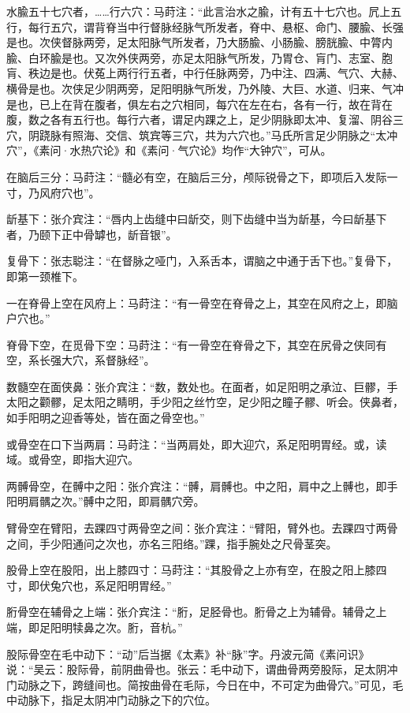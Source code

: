 \documentclass[12pt]{ctexbook}%
\begin{document}
\begin{jiaozhu}
	\item 水腧五十七穴者，……行六穴：马莳注：“此言治水之腧，计有五十七穴也。凥上五行，每行五穴，谓背脊当中行督脉经脉气所发者，脊中、悬枢、命门、腰腧、长强是也。次侠督脉两旁，足太阳脉气所发者，乃大肠腧、小肠腧、膀胱腧、中膂内腧、白环腧是也。又次外侠两旁，亦足太阳脉气所发，乃胃仓、肓门、志室、胞肓、秩边是也。伏菟上两行行五者，中行任脉两旁，乃中注、四满、气穴、大赫、横骨是也。次侠足少阴两旁，足阳明脉气所发，乃外陵、大巨、水道、归来、气冲是也，已上在背在腹者，俱左右之穴相同，每穴在左在右，各有一行，故在背在腹，数之各有五行也。每行六者，谓足内踝之上，足少阴脉即太冲、复溜、阴谷三穴，阴跷脉有照海、交信、筑宾等三穴，共为六穴也。”马氏所言足少阴脉之“太冲穴”，《素问·水热穴论》和《素问·气穴论》均作“大钟穴”，可从。
	\item 在脑后三分：马莳注：“髓必有空，在脑后三分，颅际锐骨之下，即项后入发际一寸，乃风府穴也”。
	\item 龂基下：张介宾注：“唇内上齿缝中曰龂交，则下齿缝中当为龂基，今曰龂基下者，乃颐下正中骨罅也，龂音银”。
	\item 复骨下：张志聪注：“在督脉之哑门，入系舌本，谓脑之中通于舌下也。”复骨下，即第一颈椎下。
	\item 一在脊骨上空在风府上：马莳注：“有一骨空在脊骨之上，其空在风府之上，即脑户穴也。”
	\item 脊骨下空，在觅骨下空：马莳注：“有一骨空在脊骨之下，其空在尻骨之侠同有空，系长强大穴，系督脉经”。
	\item 数髓空在面侠鼻：张介宾注：“数，数处也。在面者，如足阳明之承泣、巨髎，手太阳之颧髎，足太阳之睛明，手少阳之丝竹空，足少阳之瞳子髎、听会。侠鼻者，如手阳明之迎香等处，皆在面之骨空也。”
	\item 或骨空在口下当两肩：马莳注：“当两肩处，即大迎穴，系足阳明胃经。或，读域。或骨空，即指大迎穴。
	\item 两髆骨空，在髆中之阳：张介宾注：“髆，肩髆也。中之阳，肩中之上髆也，即手阳明肩髃之次。”髆中之阳，即肩髃穴旁。
	\item 臂骨空在臂阳，去踝四寸两骨空之间：张介宾注：“臂阳，臂外也。去踝四寸两骨之间，手少阳通问之次也，亦名三阳络。”踝，指手腕处之尺骨茎突。
	\item 股骨上空在股阳，出上膝四寸：马莳注：“其股骨之上亦有空，在股之阳上膝四寸，即伏兔穴也，系足阳明胃经。”
	\item 胻骨空在辅骨之上端：张介宾注：“胻，足胫骨也。胻骨之上为辅骨。辅骨之上端，即足阳明犊鼻之次。胻，音杭。”
	\item 股际骨空在毛中动下：“动”后当据《太素》补“脉”字。丹波元简《素问识》说：“吴云：股际骨，前阴曲骨也。张云：毛中动下，谓曲骨两旁股际，足太阴冲门动脉之下，跨缝间也。简按曲骨在毛际，今日在中，不可定为曲骨穴。”可见，毛中动脉下，指足太阴冲门动脉之下的穴位。

\end{jiaozhu}
\end{document}
